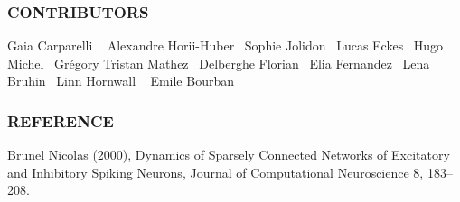 \subsubsection*{C\+O\+N\+T\+R\+I\+B\+U\+T\+O\+RS}

Gaia Carparelli ~\newline
 Alexandre Horii-\/\+Huber~\newline
 Sophie Jolidon~\newline
 Lucas Eckes~\newline
 Hugo Michel~\newline
 Grégory Tristan Mathez~\newline
 Delberghe Florian~\newline
 Elia Fernandez~\newline
 Lena Bruhin~\newline
 Linn Hornwall ~\newline
 Emile Bourban

\subsubsection*{R\+E\+F\+E\+R\+E\+N\+CE}

Brunel Nicolas (2000), Dynamics of Sparsely Connected Networks of Excitatory and Inhibitory Spiking Neurons, Journal of Computational Neuroscience 8, 183–208. 